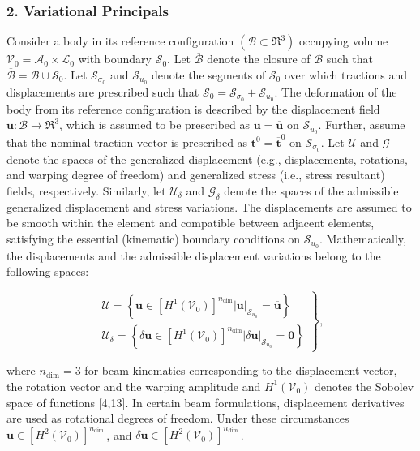 \subsubsection{2. Variational Principals}

Consider a body in its reference configuration $\left(\mathscr{B} \subset \Re^3\right)$ occupying volume $\mathscr{V}_0=\mathscr{A}_0 \times \mathscr{L}_0$ with boundary $\mathscr{S}_0$. Let $\overline{\mathscr{B}}$ denote the closure of $\mathscr{B}$ such that $\overline{\mathscr{B}}=\mathscr{B} \cup \mathscr{S}_0$. Let $\mathscr{S}_{\sigma_0}$ and $\mathscr{S}_{u_0}$ denote the segments of $\mathscr{S}_0$ over which tractions and displacements are prescribed such that $\mathscr{S}_0=\mathscr{S}_{\sigma_0}+\mathscr{S}_{u_0}$. The deformation of the body from its reference configuration is described by the displacement field $\bm{u}: \overline{\mathscr{B}} \rightarrow \Re^3$, which is assumed to be prescribed as $\bm{u}=\overline{\bm{u}}$ on $\mathscr{S}_{u_0}$. Further, assume that the nominal traction vector is prescribed as $\mathbf{t}^0=\overline{\mathbf{t}}^0$ on $\mathscr{S}_{\sigma_0}$.
Let $\mathscr{U}$ and $\mathscr{G}$ denote the spaces of the generalized displacement (e.g., displacements, rotations, and warping degree of freedom) and generalized stress (i.e., stress resultant) fields, respectively. Similarly, let $\mathscr{U}_\delta$ and $\mathscr{G}_\delta$ denote the spaces of the admissible generalized displacement and stress variations. The displacements are assumed to be smooth within the element and compatible between adjacent elements, satisfying the essential (kinematic) boundary conditions on $\mathscr{S}_{u_0}$. Mathematically, the displacements and the admissible displacement variations belong to the following spaces:

$$
\left.\begin{array}{l}
\mathscr{U}=\left\{\bm{u} \in\left[H^1\left(\mathscr{V}_0\right)\right]^{n_{\mathrm{dim}}}|\bm{u}|_{\mathscr{S}_{u_0}}=\overline{\bm{u}}\right\} \\
\mathscr{U}_\delta=\left\{\delta \bm{u} \in\left[H^1\left(\mathscr{V}_0\right)\right]^{n_{\mathrm{dim}}}|\delta \bm{u}|_{\mathscr{S}_{u_0}}=\mathbf{0}\right\}
\end{array}\right\},
$$

where $n_{\mathrm{dim}}=3$ for beam kinematics corresponding to the displacement vector, the rotation vector and the warping amplitude and $H^1\left(\mathscr{V}_0\right)$ denotes the Sobolev space of functions [4,13]. In certain beam formulations, displacement derivatives are used as rotational degrees of freedom. Under these circumstances $\bm{u} \in\left[H^2\left(\mathscr{V}_0\right)\right]^{n_{\text {dim }}}$, and $\delta \bm{u} \in\left[H^2\left(\mathscr{V}_0\right)\right]^{n_{\text {dim }}}$.

